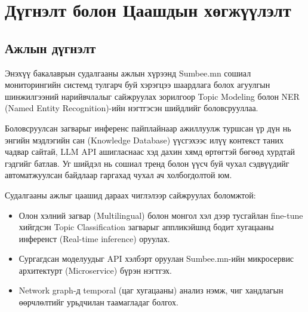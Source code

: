 \chapter{Дүгнэлт болон Цаашдын хөгжүүлэлт}
\section{Ажлын дүгнэлт}
Энэхүү бакалаврын судалгааны ажлын хүрээнд Sumbee.mn сошиал мониторингийн системд тулгарч буй хэрэгцээ шаардлага болох агуулгын шинжилгээний нарийвчлалыг сайжруулах зорилгоор Topic Modeling болон NER (Named Entity Recognition)-ийн нэгтгэсэн шийдлийг боловсрууллаа. 

Боловсруулсан загварыг инференс пайплайнаар ажиллуулж туршсан үр дүн нь энгийн мэдлэгийн сан (Knowledge Database) үүсгэхээс илүү контекст таних чадвар сайтай, LLM API ашигласнаас хэд дахин хямд өртөгтэй бөгөөд хурдтай гэдгийг батлав. Уг шийдэл нь сошиал тренд болон үүсч буй чухал сэдвүүдийг автоматжуулсан байдлаар гаргахад чухал ач холбогдолтой юм.

Судалгааны ажлыг цаашид дараах чиглэлээр сайжруулах боломжтой:
\begin{itemize}
    \item Олон хэлний загвар (Multilingual) болон монгол хэл дээр тусгайлан fine-tune хийгдсэн Topic Classification загварыг аппликэйшнд бодит хугацааны инференст (Real-time inference) оруулах.
    \item Сургагдсан моделуудыг API хэлбэрт оруулан Sumbee.mn-ийн микросервис архитектурт (Microservice) бүрэн нэгтгэх.
    \item Network graph-д temporal (цаг хугацааны) анализ нэмж, чиг хандлагын өөрчлөлтийг урьдчилан таамагладаг болгох.
\end{itemize}
